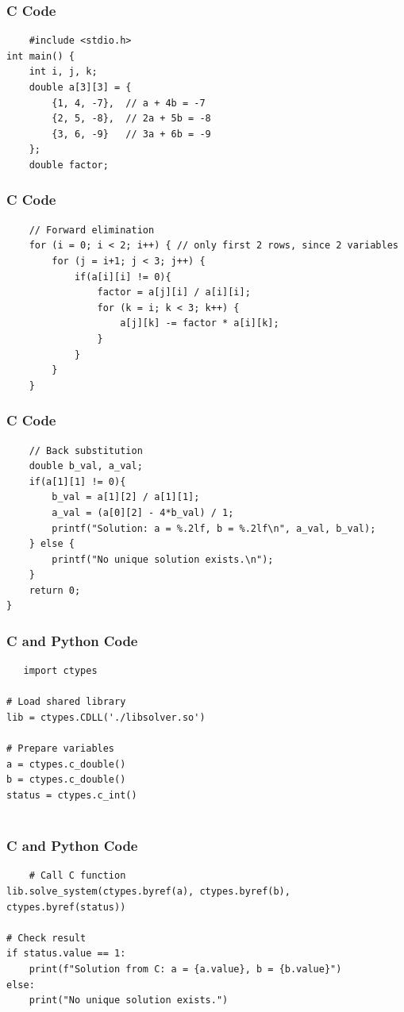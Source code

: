 \documentclass{beamer}
\begin{document}
\begin{frame}[fragile]
\frametitle{C Code}
\begin{lstlisting}
    #include <stdio.h>
int main() {
    int i, j, k;
    double a[3][3] = {
        {1, 4, -7},  // a + 4b = -7
        {2, 5, -8},  // 2a + 5b = -8
        {3, 6, -9}   // 3a + 6b = -9
    };
    double factor;
\end{lstlisting}
\end{frame}
\begin{frame}[fragile]
\frametitle{C Code}
\begin{lstlisting}
    // Forward elimination
    for (i = 0; i < 2; i++) { // only first 2 rows, since 2 variables
        for (j = i+1; j < 3; j++) {
            if(a[i][i] != 0){
                factor = a[j][i] / a[i][i];
                for (k = i; k < 3; k++) {
                    a[j][k] -= factor * a[i][k];
                }
            }
        }
    }
\end{lstlisting}
\end{frame}
\begin{frame}[fragile]
\frametitle{C Code}
\begin{lstlisting}
    // Back substitution
    double b_val, a_val;
    if(a[1][1] != 0){
        b_val = a[1][2] / a[1][1];
        a_val = (a[0][2] - 4*b_val) / 1;
        printf("Solution: a = %.2lf, b = %.2lf\n", a_val, b_val);
    } else {
        printf("No unique solution exists.\n");
    }
    return 0;
}
\end{lstlisting}
\end{frame}
\begin{frame}[fragile]
\frametitle{C and Python Code}
\begin{lstlisting}
   import ctypes

# Load shared library
lib = ctypes.CDLL('./libsolver.so')

# Prepare variables
a = ctypes.c_double()
b = ctypes.c_double()
status = ctypes.c_int()
 
\end{lstlisting}
\end{frame}
\begin{frame}[fragile]
\frametitle{C and Python Code}
\begin{lstlisting}
    # Call C function
lib.solve_system(ctypes.byref(a), ctypes.byref(b), ctypes.byref(status))

# Check result
if status.value == 1:
    print(f"Solution from C: a = {a.value}, b = {b.value}")
else:
    print("No unique solution exists.")
\end{lstlisting}
\end{frame}
\end{document}
